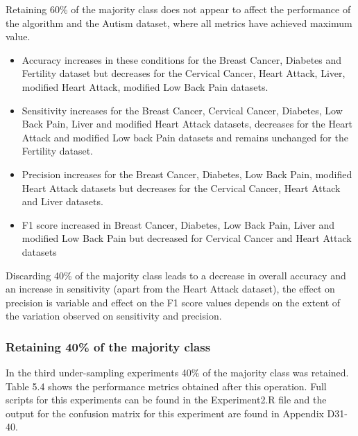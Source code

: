 Retaining 60\% of the majority class does not appear to affect the performance of the algorithm and the Autism dataset, where all metrics have achieved maximum value.
\begin{itemize}
    \item Accuracy increases in these conditions for the Breast Cancer, Diabetes and Fertility dataset but decreases for the Cervical Cancer, Heart Attack, Liver, modified Heart Attack, modified Low Back Pain datasets.
    \item Sensitivity increases for the Breast Cancer, Cervical Cancer, Diabetes, Low Back Pain, Liver and modified Heart Attack datasets, decreases for the Heart Attack and modified Low back Pain datasets and remains unchanged for the Fertility dataset.
    \item Precision increases for the Breast Cancer, Diabetes, Low Back Pain, modified Heart Attack datasets but decreases for the Cervical Cancer, Heart Attack and Liver datasets.
    \item F1 score increased in Breast Cancer, Diabetes, Low Back Pain, Liver and modified Low Back Pain but decreased for Cervical Cancer and Heart Attack datasets
\end{itemize}

Discarding 40\% of the majority class leads to a decrease in overall accuracy  and an increase in sensitivity (apart from the Heart Attack dataset), the effect on precision is variable and effect on the F1 score values depends on the extent of the variation observed on sensitivity and precision.\newline

\subsubsection{Retaining 40\% of the majority class}
In the third under-sampling experiments 40\% of the majority class was retained. Table 5.4 shows the performance metrics obtained after this operation. Full scripts for this experiments can be found in the Experiment2.R file and the output for the confusion matrix for this experiment are found in Appendix D31-40.

